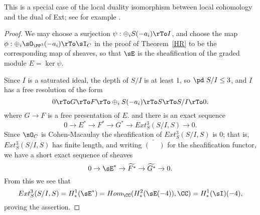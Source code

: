 This is a special case of the local duality isomorphism between local cohomology and the dual of Ext; see for example \cite[Theorem A.1.9]{MR2103875}.
\begin{proof}
We may choose a surjection  $\psi:  \oplus_iS(-a_i)\rTo I$, and choose the map
$\phi: \oplus_i\sO_{\PP^3}(-a_i)\rTo\sI_C$
in the proof of Theorem~\ref{HR}
to be the corresponding map of sheaves, so that
$\sE$ is the sheafification of the graded module $E = \ker \psi$.

Since $I$ is a saturated ideal,
 the depth of $S/I$ is at least 1, so $\pd\ S/I\leq 3$, and $I$ has a free resolution of the form
$$
0\rTo G \rTo F \rTo \oplus_iS(-a_i)  \rTo S\rTo S/I \rTo 0.
$$
where $G\to F$ is a free presentation of $E$. and there is an exact sequence
$$
0 \to E^* \to F^* \to G^* \to Ext^3_S(S/I, S) \to 0.
$$
Since $\sO_C$ is Cohen-Macaulay the sheafification of $Ext^3_S(S/I, S)$ is 0; that is,
$Ext^3_S(S/I, S)$ has finite length, and writing $\widetilde{(\phantom{-})}$ for the sheafification functor,
we have a short exact sequence of sheaves 
$$
0\to \sE^* \to \widetilde{F^*} \to \widetilde{G^*}\to 0.
$$
From this we see that 
$$
Ext^3_S(S/I,S) = H^1_*(\sE^*) = Hom_\CC( H^2_*(\sE(-4)),\CC) = H^1_*(\sI)(-4),
$$
proving the assertion.
\end{proof}
